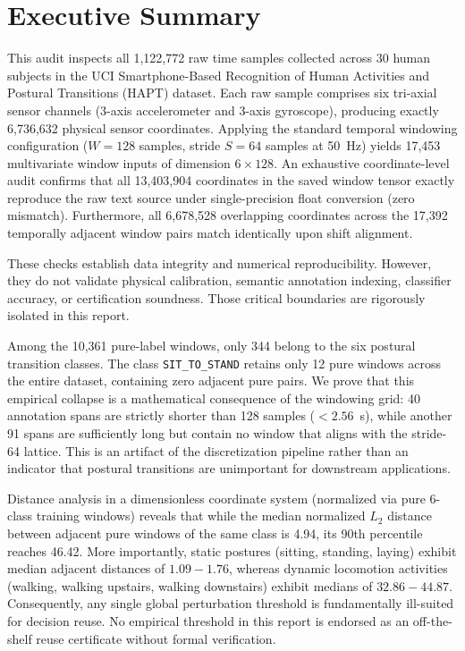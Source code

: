 \documentclass[11pt,a4paper]{article}
\newcommand{\code}[1]{{\small\ttfamily\nolinkurl{#1}}}
\theoremstyle{definition}
\begin{document}
\section*{Executive Summary}
This audit inspects all 1,122,772 raw time samples collected across 30 human subjects in the UCI Smartphone-Based Recognition of Human Activities and Postural Transitions (HAPT) dataset. Each raw sample comprises six tri-axial sensor channels (3-axis accelerometer and 3-axis gyroscope), producing exactly 6,736,632 physical sensor coordinates. Applying the standard temporal windowing configuration ($W=128$ samples, stride $S=64$ samples at 50~Hz) yields 17,453 multivariate window inputs of dimension $6 \times 128$. An exhaustive coordinate-level audit confirms that all 13,403,904 coordinates in the saved window tensor exactly reproduce the raw text source under single-precision float conversion (zero mismatch). Furthermore, all 6,678,528 overlapping coordinates across the 17,392 temporally adjacent window pairs match identically upon shift alignment.

These checks establish data integrity and numerical reproducibility. However, they do not validate physical calibration, semantic annotation indexing, classifier accuracy, or certification soundness. Those critical boundaries are rigorously isolated in this report.

Among the 10,361 pure-label windows, only 344 belong to the six postural transition classes. The class \code{SIT_TO_STAND} retains only 12 pure windows across the entire dataset, containing zero adjacent pure pairs. We prove that this empirical collapse is a mathematical consequence of the windowing grid: 40 annotation spans are strictly shorter than 128 samples ($<2.56$~s), while another 91 spans are sufficiently long but contain no window that aligns with the stride-64 lattice. This is an artifact of the discretization pipeline rather than an indicator that postural transitions are unimportant for downstream applications.

Distance analysis in a dimensionless coordinate system (normalized via pure 6-class training windows) reveals that while the median normalized $L_2$ distance between adjacent pure windows of the same class is 4.94, its 90th percentile reaches 46.42. More importantly, static postures (sitting, standing, laying) exhibit median adjacent distances of $1.09 - 1.76$, whereas dynamic locomotion activities (walking, walking upstairs, walking downstairs) exhibit medians of $32.86 - 44.87$. Consequently, any single global perturbation threshold is fundamentally ill-suited for decision reuse. No empirical threshold in this report is endorsed as an off-the-shelf reuse certificate without formal verification.
\end{document}
